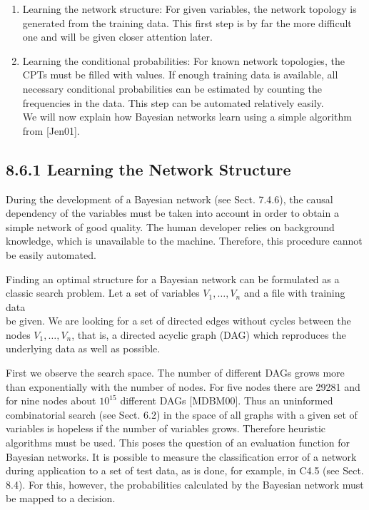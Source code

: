 \documentclass[10pt]{book}
\begin{document}
\begin{center}
\begin{enumerate}
\begin{center}
\begin{center}
\begin{enumerate}
  \item Learning the network structure: For given variables, the network topology is generated from the training data. This first step is by far the more difficult one and will be given closer attention later.
  \item Learning the conditional probabilities: For known network topologies, the CPTs must be filled with values. If enough training data is available, all necessary conditional probabilities can be estimated by counting the frequencies in the data. This step can be automated relatively easily.\\[0pt]
We will now explain how Bayesian networks learn using a simple algorithm from [Jen01].
\end{enumerate}

\subsection*{8.6.1 Learning the Network Structure}
During the development of a Bayesian network (see Sect. 7.4.6), the causal dependency of the variables must be taken into account in order to obtain a simple network of good quality. The human developer relies on background knowledge, which is unavailable to the machine. Therefore, this procedure cannot be easily automated.

Finding an optimal structure for a Bayesian network can be formulated as a classic search problem. Let a set of variables $V_{1}, \ldots, V_{n}$ and a file with training data\\
be given. We are looking for a set of directed edges without cycles between the nodes $V_{1}, \ldots, V_{n}$, that is, a directed acyclic graph (DAG) which reproduces the underlying data as well as possible.

First we observe the search space. The number of different DAGs grows more than exponentially with the number of nodes. For five nodes there are 29281 and for nine nodes about $10^{15}$ different DAGs [MDBM00]. Thus an uninformed combinatorial search (see Sect. 6.2) in the space of all graphs with a given set of variables is hopeless if the number of variables grows. Therefore heuristic algorithms must be used. This poses the question of an evaluation function for Bayesian networks. It is possible to measure the classification error of a network during application to a set of test data, as is done, for example, in C4.5 (see Sect. 8.4). For this, however, the probabilities calculated by the Bayesian network must be mapped to a decision.


\end{center}
\end{center}
\end{enumerate}
\end{center}
\end{document}
